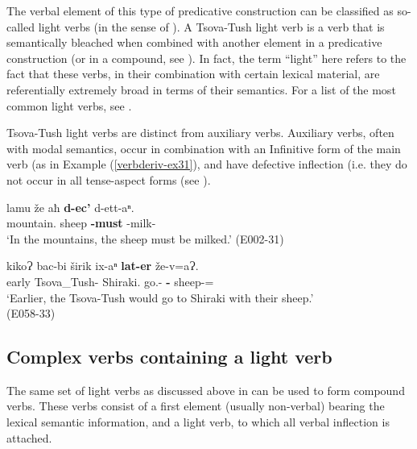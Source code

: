 The verbal element of this type of predicative construction can be classified as so-called light verbs (in the sense of \cites[117--118]{jespersen54lightverb}). A Tsova-Tush light verb is a verb that is semantically bleached when combined with another element in a predicative construction (or in a compound, see ). In fact, the term ``light'' here refers to the fact that these verbs, in their combination with certain lexical material, are referentially extremely broad in terms of their semantics. For a list of the most common light verbs, see .


Tsova-Tush light verbs are distinct from auxiliary verbs. Auxiliary verbs, often with modal semantics, occur in combination with an Infinitive form of the main verb (as in Example (\ref{verbderiv-ex31}), and have defective inflection (i.e. they do not occur in all tense-aspect forms (see \cite{holisky94}).


\begin{exe}
	\ex\label{verbderiv-ex31}
	\begin{xlist}
		
		
			\ex\label{verbderiv-ex31a}
			\gll lamu že aħ \textbf{d-ec'} d-ett-aⁿ. \\
			mountain.{\Ess} sheep {\Pv} \textbf{{\D}-must} {\D}-milk-{\Inf} \\
			\trans `In the mountains, the sheep must be milked.'
			\hfill (E002-31)
		
		
		
			\ex\label{verbderiv-ex31b}
			\gll  kikoɁ bac-bi širik ix-aⁿ \textbf{lat-er} že-v=aɁ. \\
			early Tsova\_Tush-{\Pl} Shiraki.{\Ill} go.{\Ipfv}-{\Inf} \textbf{{\Hab}-{\Imprf}} sheep-{\Ins}={\Emph} \\
			\trans `Earlier, the Tsova-Tush would go to Shiraki with their sheep.' \\
			\hfill (E058-33)
		
		
	\end{xlist}
\end{exe}


\subsection{Complex verbs containing a light verb} 

The same set of light verbs as discussed above in  can be used to form compound verbs. These verbs consist of a first element (usually non-verbal) bearing the lexical semantic information, and a light verb, to which all verbal inflection is attached.

